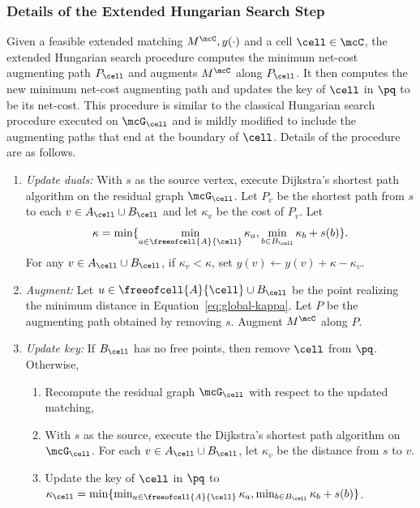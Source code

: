 \subsubsection{Details of the Extended Hungarian Search Step}\label{subsubsec:global} 
Given a feasible extended matching $M^\mcC, y(\cdot)$  and a cell $\cell\in\mcC$, the extended Hungarian search procedure computes the minimum net-cost augmenting path $P_\cell$ and augments $M^\mcC$ along $P_\cell$. It then computes the new minimum net-cost augmenting path and updates the key of $\cell$ in $\pq$ to be its net-cost. 
This procedure is similar to the classical Hungarian search procedure executed on $\mcG_\cell$ and is mildly modified to include the augmenting paths that end at the boundary of $\cell$. 
Details of the procedure are as follows. 
\begin{enumerate}
\item {\it Update duals:} With $s$ as the source vertex, execute Dijkstra's shortest path algorithm on the residual graph $\mcG_\cell$. Let $P_v$ be the shortest path from $s$ to each $v\in A_\cell\cup B_\cell$ and let $\kappa_v$ be the cost of $P_v$. Let
\begin{equation}\label{eq:global-kappa}
    \kappa = \min\{ \min_{a\in \freeofcell{A}{\cell}}\kappa_a, \min_{b\in B_\cell}\kappa_b + s(b)\}.
\end{equation}
For any $v \in A_\cell\cup B_\cell$, if $\kappa_v < \kappa$, set $ y(v) \leftarrow y(v) +\kappa - \kappa_v$.
\item {\it Augment:} Let $u\in \freeofcell{A}{\cell}\cup B_\cell$ be the point realizing the minimum distance in Equation~\eqref{eq:global-kappa}. Let $P$ be the augmenting path obtained by removing $s$. Augment $M^\mcC$ along $P$. 
\item {\it Update key:} If $B_\cell$ has no free points, then remove $\cell$ from $\pq$. Otherwise,
\begin{enumerate}
    \item Recompute the residual graph $\mcG_{\cell}$ with respect to the updated matching,
    \item With $s$ as the source, execute the Dijkstra's shortest path algorithm on $\mcG_\cell$. For each $v \in A_\cell\cup B_\cell$, let $\kappa_v$ be the distance from $s$ to $v$.
    \item  Update the key of $\cell$ in $\pq$ to $\kappa_\cell = \min\{ \min_{a\in \freeofcell{A}{\cell}}\kappa_a, \min_{b\in B_\cell}\kappa_b + s(b)\}$.
\end{enumerate}   
\end{enumerate}

